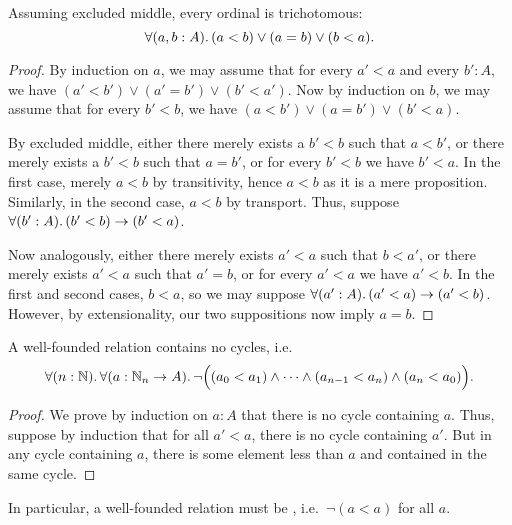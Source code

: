 \begin{lem}
  Assuming excluded middle, every ordinal is trichotomous:
  \[ \fall{a,b:A} (a<b) \vee (a=b) \vee (b<a). \]
\end{lem}
\begin{proof}
  By induction on $a$, we may assume that for every $a'<a$ and every $b':A$, we have $(a'<b') \vee (a'=b') \vee (b'<a')$.
  Now by induction on $b$, we may assume that for every $b'<b$, we have $(a<b') \vee (a=b') \vee (b'<a)$.

  By excluded middle, either there merely exists a $b'<b$ such that $a<b'$, or there merely exists a $b'<b$ such that $a=b'$, or for every $b'<b$ we have $b'<a$.
  In the first case, merely $a<b$ by transitivity, hence $a<b$ as it is a mere proposition.
  Similarly, in the second case, $a<b$ by transport.
  Thus, suppose $\fall{b':A}(b'<b)\to (b'<a)$.

  Now analogously, either there merely exists $a'<a$ such that $b<a'$, or there merely exists $a'<a$ such that $a'=b$, or for every $a'<a$ we have $a'<b$.
  In the first and second cases, $b<a$, so we may suppose $\fall{a':A}(a'<a)\to (a'<b)$.
  However, by extensionality, our two suppositions now imply $a=b$.
\end{proof}

\begin{lem}
  A well-founded relation contains no cycles, i.e.\
  \[ \fall{n:\mathbb{N}}{a:\mathbb{N}_n\to A} \neg\Big((a_0<a_1) \wedge \dots \wedge (a_{n-1}<a_n)\wedge (a_n<a_0)\Big). \]
\end{lem}
\begin{proof}
  We prove by induction on $a:A$ that there is no cycle containing $a$.
  Thus, suppose by induction that for all $a'<a$, there is no cycle containing $a'$.
  But in any cycle containing $a$, there is some element less than $a$ and contained in the same cycle.
\end{proof}

%
%
In particular, a well-founded relation must be , i.e.\ $\neg(a<a)$ for all $a$.

